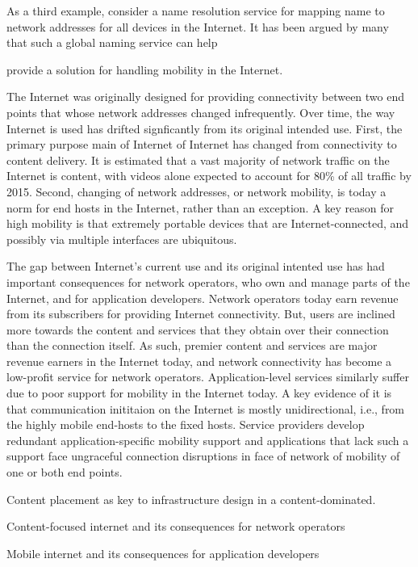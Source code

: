 As a third example, consider a name resolution service for mapping name to network addresses for all devices in the Internet. It has been argued by many that such a global naming service can help 

provide a solution for handling mobility in the Internet. 



The Internet was originally designed for providing connectivity between two end points that whose network addresses changed infrequently. Over time, the way Internet is used has drifted signficantly from its original intended use. 
First, the primary purpose main of Internet of Internet has changed from connectivity to content delivery. It is estimated that a vast majority of network traffic on the Internet is content, with videos alone expected to account for 80\% of all traffic by 2015. Second, changing of network addresses, or network mobility, is today a norm for end hosts in the Internet, rather than an exception. 
A key reason for high mobility is that extremely portable devices that are Internet-connected, and possibly via multiple interfaces are ubiquitous. 

The gap between Internet's current use and its original intented use has had important consequences for network operators, who own and manage parts of the Internet, and for application developers. Network operators today earn revenue from its subscribers for providing Internet connectivity. But, users are inclined more towards the content and services that they obtain over their connection than the connection itself. As such, premier content and services are major revenue earners in the Internet today, and network connectivity has become a low-profit service for network operators. Application-level services similarly suffer due to poor support for mobility in the Internet today. A key evidence of it is that communication inititaion on the Internet is mostly unidirectional, i.e., from the highly mobile end-hosts to the fixed hosts. Service providers develop redundant application-specific mobility support and applications that lack such a support face ungraceful connection disruptions in face of network of mobility of one or both end points.


Content placement as key to infrastructure design in a content-dominated.
 
Content-focused internet and its consequences for network operators

Mobile internet and its consequences for application developers


